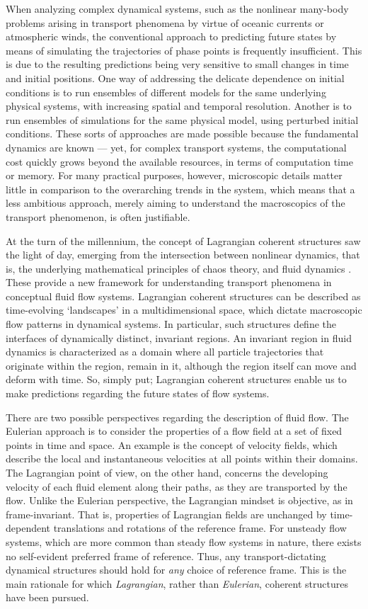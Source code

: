 When analyzing complex dynamical systems, such as the nonlinear many-body
problems arising in transport phenomena by virtue of oceanic currents or
atmospheric winds, the conventional approach to predicting future states
by means of simulating the trajectories of phase points is frequently
insufficient. This is due to the resulting predictions being very sensitive to
small changes in time and initial positions. One way of addressing the delicate
dependence on initial conditions is to run ensembles of different models for
the same underlying physical systems, with increasing spatial and temporal
resolution. Another is to run ensembles of simulations for the same physical
model, using perturbed initial conditions. These sorts of approaches are made
possible because the fundamental dynamics are known --- yet, for complex
transport systems, the computational cost quickly grows beyond the available
resources, in terms of computation time or memory. For many practical purposes,
however, microscopic details matter little in comparison to the overarching
trends in the system, which means that a less ambitious approach, merely aiming
to understand the macroscopics of the transport phenomenon, is often
justifiable.

At the turn of the millennium, the concept of Lagrangian coherent structures
saw the light of day, emerging from the intersection between nonlinear
dynamics, that is, the underlying mathematical principles of chaos theory, and
fluid dynamics \parencite{haller2000lagrangian}. These provide a new framework
for understanding transport phenomena in conceptual fluid flow systems.
Lagrangian coherent structures can be described as time-evolving `landscapes'
in a multidimensional space, which dictate macroscopic flow patterns in
dynamical systems. In particular, such structures define the interfaces of
dynamically distinct, invariant regions. An invariant region in fluid dynamics
is characterized as a domain where all particle trajectories that originate
within the region, remain in it, although the region itself can move and deform
with time. So, simply put; Lagrangian coherent structures enable us to make
predictions regarding the future states of flow systems.

There are two possible perspectives regarding the description of fluid flow.
The Eulerian approach is to consider the properties of a flow field at a set of
fixed points in time and space. An example is the concept of velocity fields,
which describe the local and instantaneous velocities at all points within
their domains. The Lagrangian point of view, on the other hand, concerns the
developing velocity of each fluid element along their paths, as they are
transported by the flow. Unlike the Eulerian perspective, the Lagrangian
mindset is objective, as in frame-invariant. That is, properties of Lagrangian
fields are unchanged by time-dependent translations and rotations of the
reference frame. For unsteady flow systems, which are more common than steady
flow systems in nature, there exists no self-evident preferred frame of
reference. Thus, any transport-dictating dynamical structures should
hold for \emph{any} choice of reference frame. This is the main
rationale for which \emph{Lagrangian}, rather than \emph{Eulerian}, coherent
structures have been pursued.

